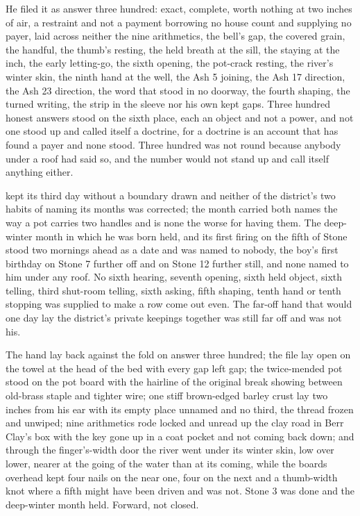 He filed it as answer three hundred: exact, complete, worth nothing at two inches of air, a restraint and not a payment borrowing no house count and supplying no payer, laid across neither the nine arithmetics, the bell's gap, the covered grain, the handful, the thumb's resting, the held breath at the sill, the staying at the inch, the early letting-go, the sixth opening, the pot-crack resting, the river's winter skin, the ninth hand at the well, the Ash 5 joining, the Ash 17 direction, the Ash 23 direction, the word that stood in no doorway, the fourth shaping, the turned writing, the strip in the sleeve nor his own kept gaps. Three hundred honest answers stood on the sixth place, each an object and not a power, and not one stood up and called itself a doctrine, for a doctrine is an account that has found a payer and none stood. Three hundred was not round because anybody under a roof had said so, and the number would not stand up and call itself anything either.

 kept its third day without a boundary drawn and neither of the district's two habits of naming its months was corrected; the month carried both names the way a pot carries two handles and is none the worse for having them. The deep-winter month in which he was born held, and its first firing on the fifth of Stone stood two mornings ahead as a date and was named to nobody, the boy's first birthday on Stone 7 further off and  on Stone 12 further still, and none named to him under any roof. No sixth hearing, seventh opening, sixth held object, sixth telling, third shut-room telling, sixth asking, fifth shaping, tenth hand or tenth stopping was supplied to make a row come out even. The far-off hand that would one day lay the district's private keepings together was still far off and was not his.

The hand lay back against the fold on answer three hundred; the file lay open on the towel at the head of the bed with every gap left gap; the twice-mended pot stood on the pot board with the hairline of the original break showing between old-brass staple and tighter wire; one stiff brown-edged barley crust lay two inches from his ear with its empty place unnamed and no third, the thread frozen and unwiped; nine arithmetics rode locked and unread up the clay road in Berr Clay's box with the key gone up in a coat pocket and not coming back down; and through the finger's-width door the river went under its winter skin, low over lower, nearer at the going of the water than at its coming, while the boards overhead kept four nails on the near one, four on the next and a thumb-width knot where a fifth might have been driven and was not. Stone 3 was done and the deep-winter month held. Forward, not closed.

